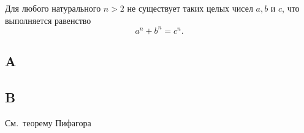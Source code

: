 \documentclass[example-notes.tex]{subfiles}
\begin{document}

    \begin{theorem}
        \label{thm:202211081205}
        Для любого натурального $n>2$ не существует таких целых чисел $a,b$ и $c$, что выполняется равенство
        \begin{equation}
            \label{eq:202211081205:ferma}
            a^n+b^n=c^n.
        \end{equation}
    \end{theorem}

    \Blindtext

    \subsection{A}
    \label{subsec:202211081205:a}
    \Blindtext
    \begin{lemma}
        \label{lem:202211081205}
        \blindtext
    \end{lemma}

   \subsection{B}\label{subsec:202211081205:b}
    \Blindtext

    \seealso
    См.~теорему Пифагора~
\end{document}
